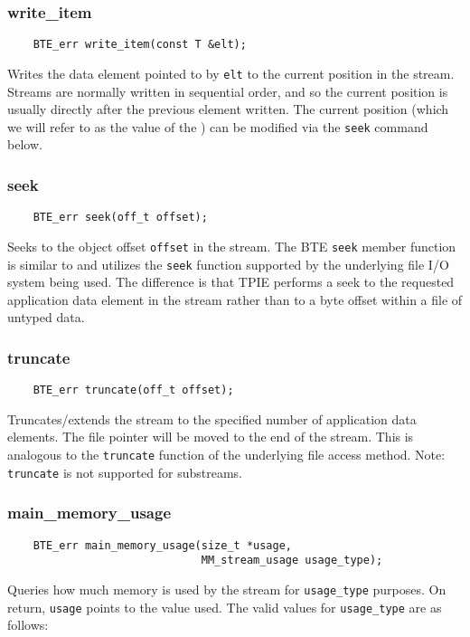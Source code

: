 \subsubsection{write\_item}
\begin{lstlisting}
    BTE_err write_item(const T &elt);
\end{lstlisting}
Writes the data element pointed to by \lstinline|elt| to the current
position in the stream. Streams are normally written in sequential
order, and so the current position is usually directly after the
previous element written. The current position (which we will refer to
as the value of the ) can be modified via the
\lstinline|seek| command below.

\subsubsection{seek}
\begin{lstlisting}
    BTE_err seek(off_t offset);
\end{lstlisting}
Seeks to the object offset \lstinline|offset| in the stream. The BTE
\lstinline|seek| member function is similar to and utilizes the
\lstinline|seek| function supported by the underlying file I/O system
being used. The difference is that TPIE performs a seek to the
requested application data element in the stream rather than to a byte
offset within a file of untyped data.


\subsubsection{truncate}
\begin{lstlisting}
    BTE_err truncate(off_t offset);
\end{lstlisting}
Truncates/extends the stream to the specified number of application
data elements. The file pointer will be moved to the end of the
stream. This is analogous to the \lstinline|truncate| function of the
underlying file access method.  Note: \lstinline|truncate| is not
supported for substreams.

\subsubsection{main\_memory\_usage}
\begin{lstlisting}
    BTE_err main_memory_usage(size_t *usage,
                              MM_stream_usage usage_type);
\end{lstlisting}
Queries how much memory is used by the stream for
\lstinline|usage_type| purposes. On return, \lstinline|usage| points
to the value used. The valid values for \lstinline|usage_type| are as
follows:

